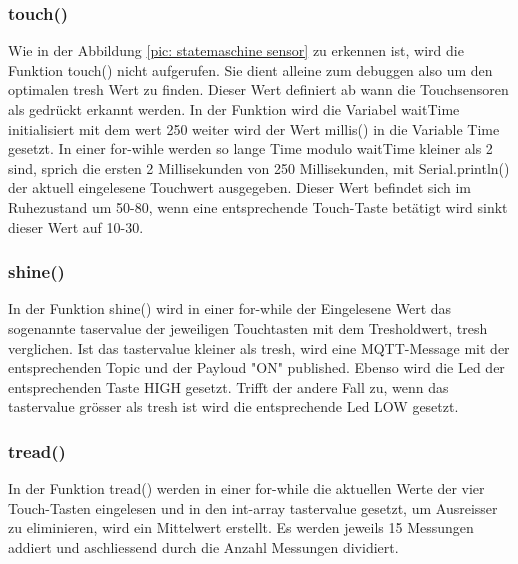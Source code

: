 \subsubsection{touch()} 
Wie in der Abbildung \ref{pic: statemaschine sensor} zu erkennen ist, wird die Funktion touch() nicht aufgerufen. Sie dient alleine zum debuggen also um den optimalen tresh Wert zu finden. Dieser Wert definiert ab wann die Touchsensoren als gedrückt erkannt werden. In der Funktion wird die Variabel waitTime initialisiert mit dem wert 250 weiter wird der Wert millis() in die Variable Time gesetzt. In einer for-wihle werden so lange Time modulo waitTime kleiner als 2 sind, sprich die ersten 2 Millisekunden von 250 Millisekunden, mit Serial.println() der aktuell eingelesene Touchwert ausgegeben. Dieser Wert befindet sich im Ruhezustand um 50-80, wenn eine entsprechende Touch-Taste betätigt wird sinkt dieser Wert auf 10-30.  
\subsubsection{shine()}
In der Funktion shine() wird in einer for-while der Eingelesene Wert das sogenannte taservalue der jeweiligen Touchtasten mit dem Tresholdwert, tresh verglichen. Ist das tastervalue kleiner als tresh, wird eine MQTT-Message mit der entsprechenden Topic und der Payloud "ON" published. Ebenso wird die Led der entsprechenden Taste HIGH gesetzt. Trifft der andere Fall zu, wenn das tastervalue grösser als tresh ist wird die entsprechende Led LOW gesetzt.
\subsubsection{tread()}
In der Funktion tread() werden in einer for-while die aktuellen Werte der vier Touch-Tasten eingelesen und in den int-array tastervalue gesetzt, um Ausreisser zu eliminieren, wird ein Mittelwert erstellt. Es werden jeweils 15 Messungen addiert und aschliessend durch die Anzahl Messungen dividiert.  
